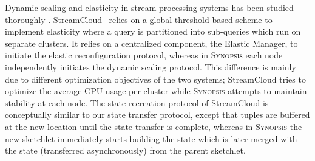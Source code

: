 \documentclass[9pt,journal,compsoc]{IEEEtran}
\begin{document}
Dynamic scaling and elasticity in stream processing systems has been studied thoroughly \cite{heinze2014auto, gulisano2012streamcloud, castro2013integrating, loesing2012stormy, heinze2013elastic, schneider2009elastic}.
StreamCloud~\cite{gulisano2012streamcloud} relies on a global threshold-based scheme to implement elasticity where a query is partitioned into sub-queries which run on separate clusters.
It relies on a centralized component, the Elastic Manager, to initiate the elastic reconfiguration protocol, whereas in \textsc{Synopsis} each node independently initiates the dynamic scaling protocol.
This difference is mainly due to different optimization objectives of the two systems; StreamCloud tries to optimize the average CPU usage per cluster while \textsc{Synopsis} attempts to maintain stability at each node.
The state recreation protocol of StreamCloud is conceptually similar to our state transfer protocol, except that tuples are buffered at the new location until the state transfer is complete, whereas in \textsc{Synopsis} the new sketchlet immediately starts building the state which is later merged with the state (transferred asynchronously) from the parent sketchlet.
\end{document}
